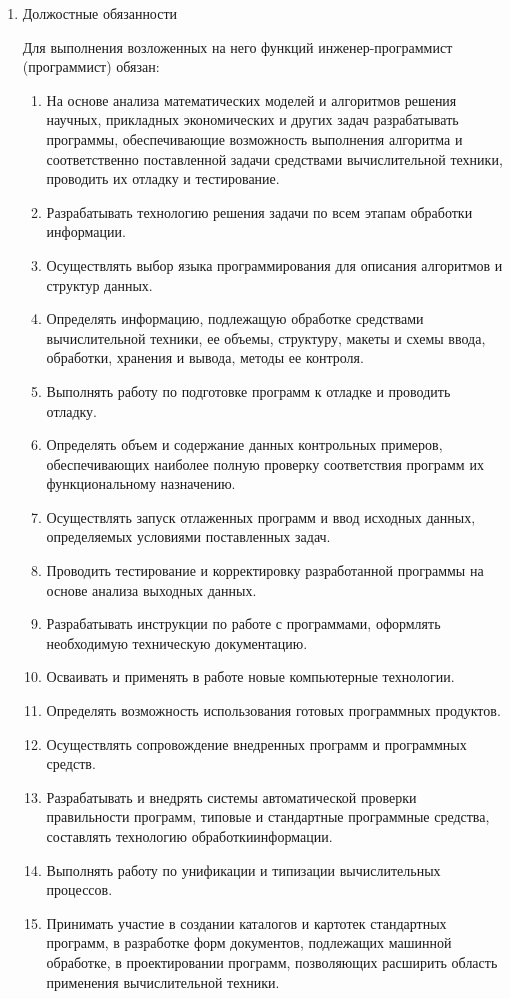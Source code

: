 \documentclass[12pt,a4paper,draft]{report}
\begin{document}
\begin{enumerate}
    \item Должостные обязанности

    Для выполнения возложенных на него функций инженер-программист (программист) обязан:
    \begin{enumerate}
        \item На основе анализа математических моделей и алгоритмов решения научных, прикладных экономических и других задач разрабатывать программы, обеспечивающие возможность выполнения алгоритма и соответственно поставленной задачи средствами вычислительной техники, проводить их отладку и тестирование.
        \item Разрабатывать технологию решения задачи по всем этапам обработки информации.
        \item Осуществлять выбор языка программирования для описания алгоритмов и структур данных.
        \item Определять информацию, подлежащую обработке средствами вычислительной техники, ее объемы, структуру, макеты и схемы ввода, обработки, хранения и вывода, методы ее контроля.
        \item Выполнять работу по подготовке программ к отладке и проводить отладку.
        \item Определять объем и содержание данных контрольных примеров, обеспечивающих наиболее полную проверку соответствия программ их функциональному назначению.
        \item Осуществлять запуск отлаженных программ и ввод исходных данных, определяемых условиями поставленных задач.
        \item Проводить тестирование и корректировку разработанной программы на основе анализа выходных данных.
        \item Разрабатывать инструкции по работе с программами, оформлять необходимую техническую документацию.
        \item Осваивать и применять в работе новые компьютерные технологии.
        \item Определять возможность использования готовых программных продуктов.
        \item Осуществлять сопровождение внедренных программ и программных средств.
        \item Разрабатывать и внедрять системы автоматической проверки правильности программ, типовые и стандартные программные средства, составлять технологию обработкиинформации.
        \item Выполнять работу по унификации и типизации вычислительных процессов.
        \item Принимать участие в создании каталогов и картотек стандартных программ, в разработке форм документов, подлежащих машинной обработке, в проектировании программ, позволяющих расширить область применения вычислительной техники.
    \end{enumerate}


\end{enumerate}
\end{document}
